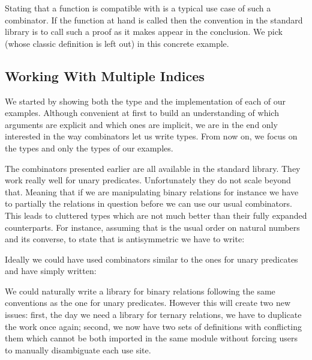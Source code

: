 
Stating that a function is compatible with  is a typical use case
of such a combinator. If the function at hand is called  then the
convention in the standard library is to call such a proof  as it
makes  appear in the conclusion. We pick  (whose classic
definition is left out) in this concrete example.


\subsection{Working With Multiple Indices}

We started by showing both the type and the implementation of each of our
examples. Although convenient at first to build an understanding of which
arguments are explicit and which ones are implicit, we are in the end only
interested in the way combinators let us write types. From now on, we
focus on the types and only the types of our examples.

The combinators presented earlier are all available in the standard library.
They work really well for unary predicates. Unfortunately they do not scale
beyond that. Meaning that if we are manipulating binary relations for
instance we have to partially the relations in question before we can use
our usual combinators. This leads to cluttered types which are not much better
than their fully expanded counterparts. For instance, assuming that 
is the usual order on natural numbers and  its converse, to state
that  is antisymmetric we have to write:


Ideally we could have used combinators similar to the ones for unary predicates
and have simply written:


We could naturally write a library for binary relations following the same
conventions as the one for unary predicates. However this will create two
new issues: first, the day we need a library for ternary relations, we have to
duplicate the work once again; second, we now have two sets of definitions
with conflicting them which cannot be both imported in the same module without
forcing users to manually disambiguate each use site.

